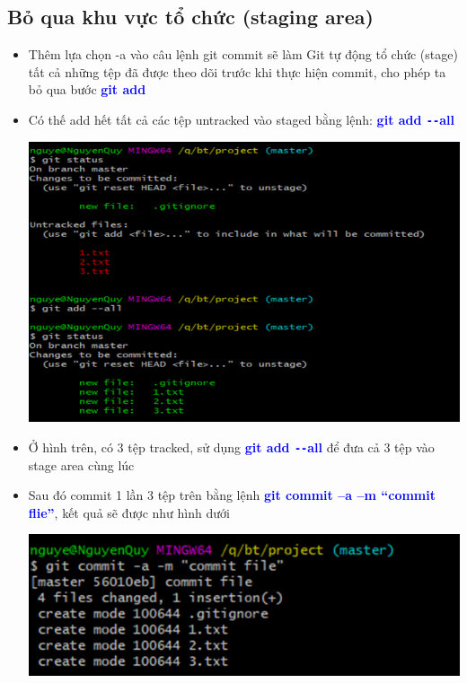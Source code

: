 \documentclass[12pt,a4paper]{report}
\begin{document}
\subsection{Bỏ qua khu vực tổ chức (staging area)}
\begin{itemize}
\item Thêm lựa chọn -a vào câu lệnh git commit sẽ làm Git tự động tổ chức (stage) tất cả những tệp đã được theo dõi trước khi thực hiện commit, cho phép ta bỏ qua bước \textcolor{blue}{\bf git add}
\item Có thế add hết tất cả các tệp untracked vào staged bằng lệnh: \textcolor{blue}{\bf git add \texttt{-{}-}all}

	\includegraphics[width=0.8\linewidth]{screenshot013}

	\label{fig:screenshot013}

\item Ở hình trên, có 3 tệp tracked, sử dụng \textcolor{blue}{\bf git add \texttt{-{}-}all} để đưa cả 3 tệp vào stage area cùng lúc
\item Sau đó commit 1 lần 3 tệp trên bằng lệnh \textcolor{blue}{\bf git commit –a –m “commit flie”}, kết quả sẽ được như hình dưới

	\includegraphics[width=0.8\linewidth]{screenshot014}

	\label{fig:screenshot014}
\end{itemize}
\end{document}
